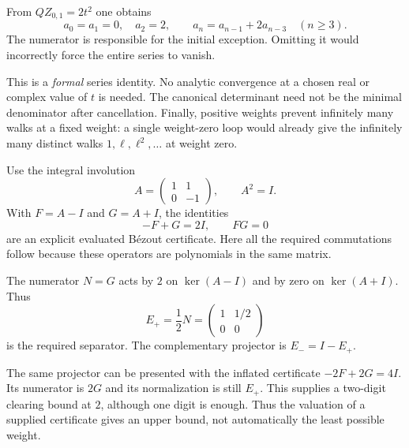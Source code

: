 
From $QZ_{0,1}=2t^2$ one obtains
\[
a_0=a_1=0,\quad a_2=2,\qquad a_n=a_{n-1}+2a_{n-3}\quad(n\ge3).
\]
The numerator is responsible for the initial exception. Omitting it would incorrectly force the entire series to vanish.

This is a \emph{formal} series identity. No analytic convergence at a chosen real or complex value of $t$ is needed. The canonical determinant need not be the minimal denominator after cancellation. Finally, positive weights prevent infinitely many walks at a fixed weight: a single weight-zero loop would already give the infinitely many distinct walks $1,\ell,\ell^2,\ldots$ at weight zero.


Use the integral involution
\[
A=\begin{pmatrix}1&1\\0&-1\end{pmatrix},\qquad A^2=I.
\]
With $F=A-I$ and $G=A+I$, the identities
\[
-F+G=2I,\qquad FG=0
\]
are an explicit evaluated B\'ezout certificate. Here all the required commutations follow because these operators are polynomials in the same matrix.


The numerator $N=G$ acts by $2$ on $\ker(A-I)$ and by zero on $\ker(A+I)$. Thus
\[
E_+=\frac12N
=\begin{pmatrix}1&1/2\\0&0\end{pmatrix}
\]
is the required separator. The complementary projector is $E_-=I-E_+$.

The same projector can be presented with the inflated certificate $-2F+2G=4I$. Its numerator is $2G$ and its normalization is still $E_+$. This supplies a two-digit clearing bound at $2$, although one digit is enough. Thus the valuation of a supplied certificate gives an upper bound, not automatically the least possible weight.

